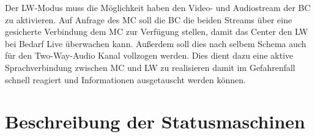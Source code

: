 \documentclass[thesis.tex]{subfiles}
\begin{document}
Der LW-Modus muss die Möglichkeit haben den Video- und Audiostream der BC zu aktivieren.
Auf Anfrage des MC soll die BC die beiden Streams über eine gesicherte Verbindung dem MC zur Verfügung stellen,
damit das Center den LW bei Bedarf Live überwachen kann.
Außerdem soll dies nach selbem Schema auch für den Two-Way-Audio Kanal vollzogen werden.
Dies dient dazu eine aktive Sprachverbindung zwischen MC und LW zu realisieren damit im Gefahrenfall schnell reagiert
und Informationen ausgetauscht werden können.

\section{Beschreibung der Statusmaschinen}


\subfilebib %
\end{document}
